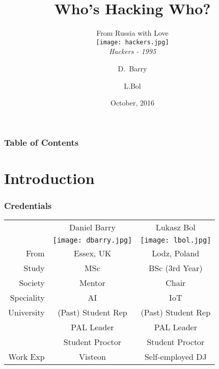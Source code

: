 \documentclass[10pt]{beamer}
\title{Who's Hacking Who?}
\subtitle{
  From Russia with Love
  \vspace{0.5cm}
  \\
  \texttt{[image: hackers.jpg]}
  \\
  \scriptsize{\emph{Hackers - 1995}}
}
\author[UH CSS]{D.~Barry\inst{1} \and L.Bol\inst{1}}
\institute{
  \inst{1}
  Computer Science Society
  \\
  University of Hertforshire
}
\date{October, 2016}
\begin{document}
  \frame{\titlepage}
  \begin{frame}
    \frametitle{Table of Contents}
    \begin{block}{}
      \vspace{0.5cm}
      \tableofcontents
      \vspace{0.5cm}
    \end{block}
  \end{frame}
  \section[Intro]{Introduction}
  \begin{frame}
    \frametitle{Credentials}
    \centering
    \begin{tabular}{| r | c | c |}
      \hline
                 & Daniel Barry                                            & Lukasz Bol     \\
                 & \texttt{[image: dbarry.jpg]} & \texttt{[image: lbol.jpg]} \\
      \hline
      From       & Essex, UK                                               & Lodz, Poland                                          \\
      Study      & MSc                                                     & BSc (3rd Year)                                        \\
      Society    & Mentor                                                  & Chair                                                 \\
      Speciality & AI                                                      & IoT                                                   \\
      University & (Past) Student Rep                                      & (Past) Student Rep                                    \\
                 & PAL Leader                                              & PAL Leader                                            \\
                 & Student Proctor                                         & Student Proctor                                       \\
      Work Exp   & Visteon                                                 & Self-employed DJ                                      \\
      \hline
    \end{tabular}
  \end{frame}
\end{document}
